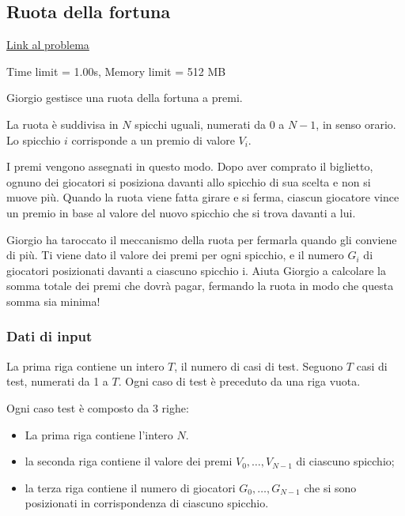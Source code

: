 \newpage
\subsection{Ruota della fortuna}
\href{https://territoriali.olinfo.it/task/fortuna}{Link al problema}

\smallskip

\noindent Time limit = 1.00s, Memory limit = 512 MB

\bigskip

Giorgio gestisce una ruota della fortuna a premi.

La ruota è suddivisa in \(N\) spicchi uguali, numerati da \(0\) a \(N-1\), in senso orario. Lo spicchio \(i\) corrisponde a un premio di valore \(V_i\).  

\medskip
I premi vengono assegnati in questo modo. 
Dopo aver comprato il biglietto, ognuno dei giocatori si posiziona davanti allo spicchio di sua scelta e non si muove più. Quando la ruota viene fatta girare e si ferma, ciascun giocatore vince un premio in base al valore del nuovo spicchio che si trova davanti a lui.

\medskip

Giorgio ha taroccato il meccanismo della ruota per fermarla quando gli conviene di più. Ti viene dato il valore dei premi per ogni spicchio, e il numero \(G_i\) di giocatori posizionati davanti a ciascuno spicchio i. Aiuta Giorgio a calcolare la somma totale dei premi che dovrà pagar, fermando la ruota in modo che questa somma sia minima!

\subsubsection*{Dati di input}

La prima riga contiene un intero \(T\), il numero di casi di test.  
Seguono \(T\) casi di test, numerati da 1 a \(T\). Ogni caso di test è preceduto da una riga vuota.

\medskip

Ogni caso test è composto da \(3\) righe:

\begin{itemize}
	\item La prima riga contiene l'intero \(N\).
	\item la seconda riga contiene il valore dei premi \(V_0, \dots, V_{N-1}\) di ciascuno spicchio;
	\item la terza riga contiene il numero di giocatori \(G_0, \dots, G_{N-1}\) che si sono posizionati in corrispondenza di ciascuno spicchio.
\end{itemize}

